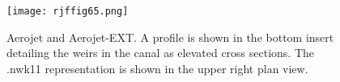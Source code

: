 \begin{figure}[!h]
  \begin{center}
  \texttt{[image: rjffig65.png]}
  \caption[Aerojet and Aerojet-EXT.]{Aerojet and Aerojet-EXT. A profile is shown in the bottom insert detailing the weirs in the canal as elevated cross sections. The .nwk11 representation is shown in the upper right plan view.}
  \label{fig:rjffig65}
  \end{center}
\end{figure}



\clearpage

\cleardoublepage




